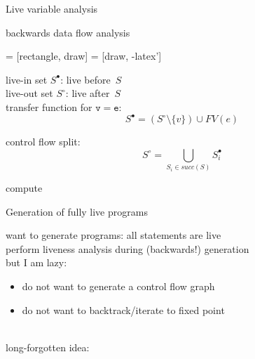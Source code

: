\documentclass{beamer}
\newcommand{\liveout}[1]{\ensuremath{#1^{\circ}}}
\newcommand{\livein}[1]{\ensuremath{#1^{\bullet}}}
\def\union{\cup}
\begin{document}
\begin{frame}[fragile]{Live variable analysis}

backwards data flow analysis \\[1em]

\begin{minipage}[c]{.45\textwidth}
 = [rectangle, draw]
 = [draw, -latex']

\end{minipage}
\hfill
\begin{minipage}[c]{.45\textwidth}

live-in set \(\livein{S}\): live before~\(S\) \\
live-out set \(\liveout{S}\): live after~\(S\) \\

transfer function for \(\mathtt{v = e}\):
\[
\livein{S} = (\liveout{S} \setminus \{v\}) \union FV(e)
\]

control flow split:
\[\liveout{S} = \bigcup_{S_i \in \mathit{succ}(S)}
\livein{S_i}\]

compute 
\end{minipage}

\end{frame}


\begin{frame}{Generation of fully live programs}

want to generate  programs: all statements are live\\[1em]

 perform liveness analysis during (backwards!) generation \\[1em]

\pause
but I am lazy:
\begin{itemize}
\item do \alert{not} want to generate a control flow graph
\item do \alert{not} want to backtrack/iterate to fixed point
\end{itemize}

\mbox{}\\[1em]
long-forgotten idea:
\begin{center}
\end{center}

\end{frame}
\end{document}

